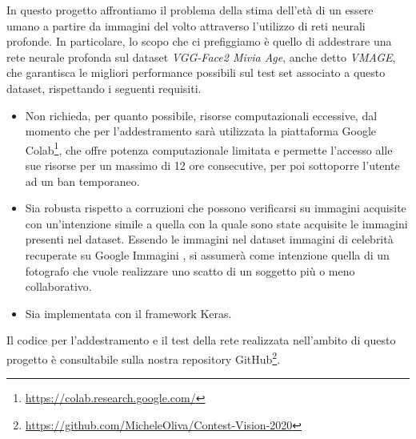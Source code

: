 In questo progetto affrontiamo il problema della stima dell'età di un essere umano a partire da immagini del volto attraverso l'utilizzo di reti neurali profonde. 
In particolare, lo scopo che ci prefiggiamo è quello di addestrare una rete neurale profonda sul dataset \emph{VGG-Face2 Mivia Age}, anche detto \emph{VMAGE}\cite{miviaage}, che garantisca le migliori performance possibili sul test set associato a questo dataset, rispettando i seguenti requisiti.

\begin{itemize}
	\item Non richieda, per quanto possibile, risorse computazionali eccessive, dal momento che per l'addestramento sarà utilizzata la piattaforma Google Colab\footnote{\url{https://colab.research.google.com/}}, che offre potenza computazionale limitata e permette l'accesso alle sue risorse per un massimo di 12 ore consecutive, per poi sottoporre l'utente ad un ban temporaneo.
	\item \label{sec:intro.intention}Sia robusta rispetto a corruzioni che possono verificarsi su immagini acquisite con un'intenzione simile a quella con la quale sono state acquisite le immagini presenti nel dataset.
Essendo le immagini nel dataset immagini di celebrità recuperate su Google Immagini \cite{vggface2dataset}, si assumerà come intenzione quella di un fotografo che vuole realizzare uno scatto di un soggetto più o meno collaborativo.
	\item Sia implementata con il framework Keras.
\end{itemize}

Il codice per l’addestramento e il test della rete realizzata nell’ambito di questo progetto è consultabile sulla nostra repository GitHub\footnote{\url{https://github.com/MicheleOliva/Contest-Vision-2020}}.